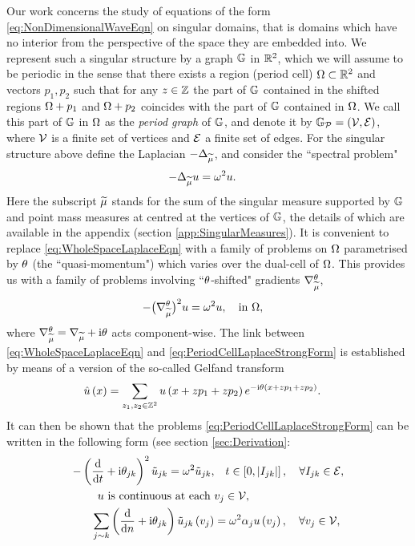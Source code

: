 Our work concerns the study of equations of the form \eqref{eq:NonDimensionalWaveEqn} on singular domains, that is domains which have no interior from the perspective of the space they are embedded into.
We represent such a singular structure by a graph $\mathbb{G}$ in $\mathbb{R}^2$, which we will assume to be periodic in the sense that there exists a region (period cell) $\Omega\subset\mathbb{R}^2$ and vectors $p_1, p_2$ such that for any $z\in\mathbb{Z}$ the part of $\mathbb{G}$ contained in the shifted regions $\Omega+p_1$ and $\Omega+p_2$ coincides with the part of $\mathbb{G}$ contained in $\Omega$.
We call this part of $\mathbb{G}$ in $\Omega$ as the \emph{period graph} of $\mathbb{G}$, and denote it by $\mathbb{G}_{\mathcal{P}}=\left( \mathcal{V}, \mathcal{E} \right)$, where $\mathcal{V}$ is a finite set of vertices and $\mathcal{E}$ a finite set of edges.
For the singular structure above define the Laplacian $-\Delta_{\widetilde{\mu}}$, and consider the ``spectral problem"
\begin{align} \label{eq:WholeSpaceLaplaceEqn}
	-\Delta_{\widetilde{\mu}} u &= \omega^2 u.
\end{align}
Here the subscript $\widetilde{\mu}$ stands for the sum of the singular measure supported by $\mathbb{G}$ and point mass measures at centred at the vertices of $\mathbb{G}$, the details of which are available in the appendix (section \ref{app:SingularMeasures}).
It is convenient to replace \eqref{eq:WholeSpaceLaplaceEqn} with a family of problems on $\Omega$ parametrised by $\theta$ (the ``quasi-momentum") which varies over the dual-cell of $\Omega$.
This provides us with a family of problems involving ``$\theta$-shifted" gradients $\nabla^{\theta}_{\widetilde{\mu}}$,
\begin{align} \label{eq:PeriodCellLaplaceStrongForm}
	-\bigl(\nabla^{\theta}_{\widetilde{\mu}}\bigr)^2 u &= \omega^2 u, \quad\text{in } \Omega,
\end{align}
where $\nabla^{\theta}_{\widetilde{\mu}} = \nabla_{\widetilde{\mu}} + \mathrm{i}\theta$ acts component-wise.
The link between \eqref{eq:WholeSpaceLaplaceEqn} and \eqref{eq:PeriodCellLaplaceStrongForm} is established by means of a version of the so-called Gelfand transform 
\begin{align*}
	\hat{u}\left( x \right) &= \sum_{z_1,z_2\in\mathbb{Z}^2}u\left( x+zp_1+zp_2 \right)e^{-\mathrm{i}\theta\left( x+zp_1+zp_2 \right)}.
\end{align*}
It can then be shown that the problems \eqref{eq:PeriodCellLaplaceStrongForm} can be written in the following form (see section \ref{sec:Derivation}:
\begin{subequations} \label{eq:QGFullSystem}
	\begin{align}
		-\left( \dfrac{\mathrm{d}}{\mathrm{d}t} + \mathrm{i}\theta_{jk} \right)^2 \tilde{u}_{jk} = \omega^2 \tilde{u}_{jk}, &\quad t\in\left[ 0,\left\lvert I_{jk} \right\rvert \right], \quad \forall I_{jk}\in \mathcal{E}, \label{eq:QGEdgeODEs} \\
		u \text{ is continuous at each } &v_j \in \mathcal{V}, \label{eq:QGVertCty}\\
		\sum_{j\sim k}\left( \dfrac{\mathrm{d}}{\mathrm{d}n} + \mathrm{i}\theta_{jk} \right)\tilde{u}_{jk}\left( v_j \right) &= \omega^2\alpha_{j}u\left( v_j \right), \quad \forall v_j \in \mathcal{V}, \label{eq:QGDerivCondition}
	\end{align}
\end{subequations}
